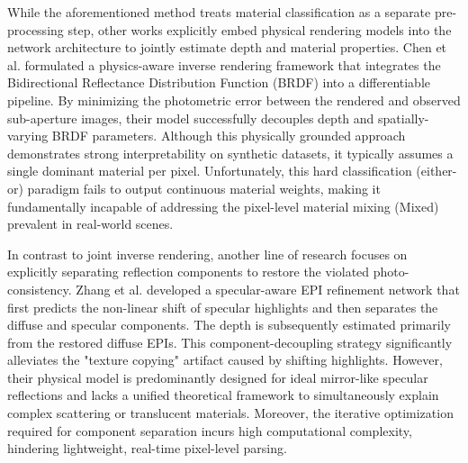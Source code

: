 While the aforementioned method treats material classification as a separate pre-processing step, other works explicitly embed physical rendering models into the network architecture to jointly estimate depth and material properties. Chen et al. \cite{physicsbasedlightfieldinve} formulated a physics-aware inverse rendering framework that integrates the Bidirectional Reflectance Distribution Function (BRDF) into a differentiable pipeline. By minimizing the photometric error between the rendered and observed sub-aperture images, their model successfully decouples depth and spatially-varying BRDF parameters. Although this physically grounded approach demonstrates strong interpretability on synthetic datasets, it typically assumes a single dominant material per pixel. Unfortunately, this hard classification (either-or) paradigm fails to output continuous material weights, making it fundamentally incapable of addressing the pixel-level material mixing (Mixed) prevalent in real-world scenes.

In contrast to joint inverse rendering, another line of research focuses on explicitly separating reflection components to restore the violated photo-consistency. Zhang et al. \cite{specularseparationlightfiel} developed a specular-aware EPI refinement network that first predicts the non-linear shift of specular highlights and then separates the diffuse and specular components. The depth is subsequently estimated primarily from the restored diffuse EPIs. This component-decoupling strategy significantly alleviates the "texture copying" artifact caused by shifting highlights. However, their physical model is predominantly designed for ideal mirror-like specular reflections and lacks a unified theoretical framework to simultaneously explain complex scattering or translucent materials. Moreover, the iterative optimization required for component separation incurs high computational complexity, hindering lightweight, real-time pixel-level parsing.

